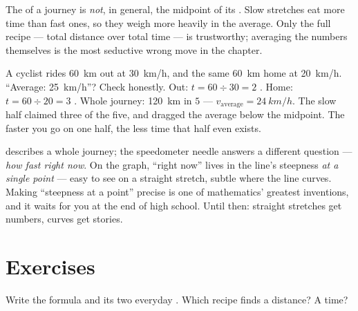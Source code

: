 \begin{proposition}\label{prop:g7:motion-average-speed:trap}
The  of a journey is \emph{not}, in general, the
midpoint of its . Slow stretches eat more time than fast
ones, so they weigh more heavily in the average. Only the full
recipe --- total distance over total time --- is trustworthy;
averaging the  numbers themselves is the most seductive
wrong move in the chapter.
\end{proposition}

\begin{example}\label{ex:g7:motion-average-speed:sprung}
A cyclist rides \qty{60}{km} out at \qty{30}{km/h}, and the same
\qty{60}{km} home at \qty{20}{km/h}. ``Average:
\qty{25}{km/h}''? Check honestly. Out: $t = 60 \div 30 = 2$
. Home: $t = 60 \div 20 = 3$ . Whole journey:
\qty{120}{km} in $5$  ---
$v_{\text{average}} = \qty{24}{km/h}$. The slow half claimed
three  of the five, and dragged the average below the
midpoint. The faster you go on one half, the less time that
half even exists.
\end{example}

\begin{remark}\label{rem:g7:motion-average-speed:speedometer}
 describes a whole journey; the speedometer needle
answers a different question --- \emph{how fast right now}. On
the graph, ``right now'' lives in the line's steepness \emph{at
a single point} --- easy to see on a straight stretch, subtle
where the line curves. Making ``steepness at a point'' precise
is one of mathematics' greatest inventions, and it waits for you
at the end of high school. Until then: straight stretches get
numbers, curves get stories.
\end{remark}

\section{Exercises}

\begin{exercise}[$\star$]\label{exo:g7:motion-average-speed:1}
Write the  formula and its two everyday . Which recipe
finds a distance? A time?
\end{exercise}

